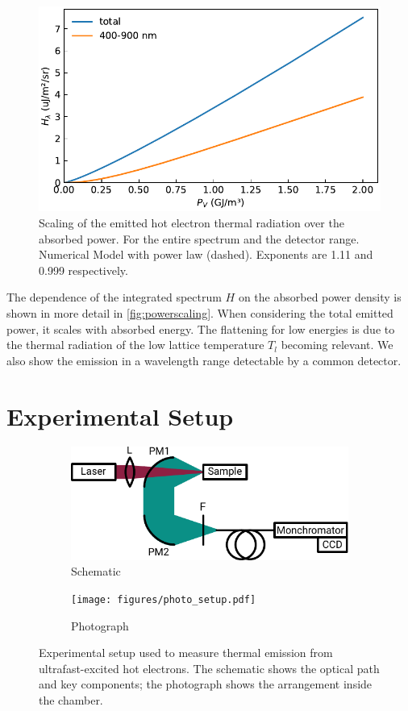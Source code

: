 \documentclass[
	a4paper,
]{scrarticle}
\begin{document}
\begin{figure}
    \centering
    \includegraphics{../analysis/figures/powerscaling.pdf}
    \caption{Scaling of the emitted hot electron thermal radiation over the absorbed power. For the entire spectrum and the detector range. Numerical Model with power law (dashed). Exponents are 1.11 and 0.999 respectively.}
    \label{fig:powerscaling}
\end{figure}
The dependence of the integrated spectrum $H$ on the absorbed power density is shown in more detail in \autoref{fig:powerscaling}.
When considering the total emitted power, it scales with absorbed energy. The flattening for low energies is due to the thermal radiation of the low lattice temperature $T_l$ becoming relevant.
We also show the emission in a wavelength range detectable by a common detector.

\clearpage
\section{Experimental Setup}
\begin{figure}[h]
    \centering
    \begin{subfigure}{3.5in}
        \centering
        \includegraphics{figures/setup.pdf}
        \caption{Schematic}
    \end{subfigure}\hfill
    \begin{subfigure}{2in}
        \centering
        \texttt{[image: figures/photo\_setup.pdf]}
        \caption{Photograph}
    \end{subfigure}
    \caption{Experimental setup used to measure thermal emission from ultrafast-excited hot electrons. The schematic shows the optical path and key components; the photograph shows the arrangement inside the chamber.}
    \label{fig:setup}
\end{figure}
\end{document}
